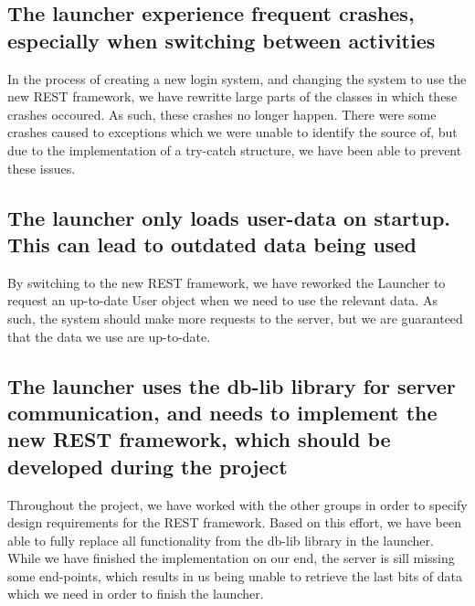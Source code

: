 \subsection*{The launcher experience frequent crashes, especially when switching between
activities}
In the process of creating a new login system, and changing the
system to use the new REST framework, we have rewritte large parts of the
classes in which these crashes occoured. As such, these crashes no longer
happen. There were some crashes caused to exceptions which we were unable to
identify the source of, but due to the implementation of a try-catch structure,
we have been able to prevent these issues.

\subsection*{The launcher only loads user-data on startup. This can lead to outdated data
being used}
By switching to the new REST framework, we have reworked the
Launcher to request an up-to-date User object when we need to use the relevant
data. As such, the system should make more requests to the server, but we are
guaranteed that the data we use are up-to-date.

\subsection*{The launcher uses the db-lib library for server communication, and needs to
implement the new REST framework, which should be developed during the project}
Throughout the project, we have worked with the other groups in order to
specify design requirements for the REST framework. Based on this effort, we
have been able to fully replace all functionality from the db-lib library in the
launcher. While we have finished the implementation on our end, the server is
sill missing some end-points, which results in us being unable to retrieve the
last bits of data which we need in order to finish the launcher.

